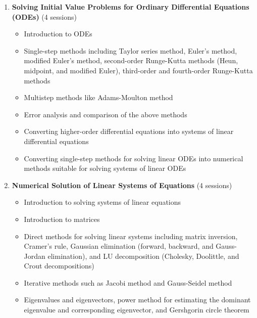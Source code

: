\documentclass[12pt]{article}
\begin{document}
\begin{enumerate}
    \item \textbf{Solving Initial Value Problems for Ordinary Differential Equations (ODEs)} (4 sessions)
        \begin{itemize}
            \item Introduction to ODEs
            \item Single-step methods including Taylor series method, Euler’s method, modified Euler’s method, second-order Runge-Kutta methods (Heun, midpoint, and modified Euler), third-order and fourth-order Runge-Kutta methods
            \item Multistep methods like Adams-Moulton method
            \item Error analysis and comparison of the above methods
            \item Converting higher-order differential equations into systems of linear differential equations
            \item Converting single-step methods for solving linear ODEs into numerical methods suitable for solving systems of linear ODEs
        \end{itemize}

    \item \textbf{Numerical Solution of Linear Systems of Equations} (4 sessions)
        \begin{itemize}
            \item Introduction to solving systems of linear equations
            \item Introduction to matrices
            \item Direct methods for solving linear systems including matrix inversion, Cramer's rule, Gaussian elimination (forward, backward, and Gauss-Jordan elimination), and LU decomposition (Cholesky, Doolittle, and Crout decompositions)
            \item Iterative methods such as Jacobi method and Gauss-Seidel method
            \item Eigenvalues and eigenvectors, power method for estimating the dominant eigenvalue and corresponding eigenvector, and Gershgorin circle theorem
        \end{itemize}
\end{enumerate}
\end{document}
